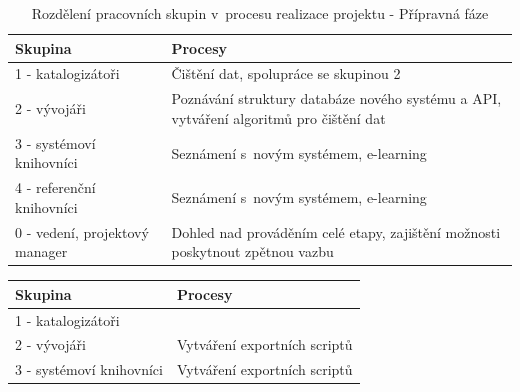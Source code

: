 \documentclass[
	11pt, oneside, printed, final, palatino, monochrome
	microtype,
	table,   %
	lof,     %
	lot     %
]{fithesis3}
\newcommand{\bold}[1]{\textbf{#1}}
\begin{document}
{\begin{table}[H]
    \centering
    \begin{tabular}{| p{3cm} | p{8.3cm} |}
    \hline
    \bold{Skupina} 	
    & 
    \bold{Procesy} 
    \\ \hline
    
    1 - katalogizátoři 
    & 
    Čištění dat, spolupráce se skupinou 2 
    \\ \hline
    
    2 - vývojáři 
    & 
	Poznávání struktury databáze nového systému a API, vytváření algoritmů pro čištění dat	
    \\ \hline
    
    3 - systémoví knihovníci
    & 
    Seznámení s~novým systémem, e-learning
    \\ \hline
    
    4 - referenční knihovníci
    & 
    Seznámení s~novým systémem, e-learning
    \\ \hline

	0 - vedení, projektový manager
    & 
    Dohled nad prováděním celé etapy, zajištění možnosti poskytnout zpětnou vazbu
    \\ \hline
    
    \end{tabular}
    \caption{Rozdělení pracovních skupin v~procesu realizace projektu - Přípravná fáze}
\end{table}
    
\begin{table}[H]
    \centering
    \begin{tabular}{| p{3cm} | p{8.3cm} |}
    \hline
    \bold{Skupina} 	
    & 
    \bold{Procesy} 
    \\ \hline
    
	1 - katalogizátoři
    & 
    
    \\ \hline
    
	2 - vývojáři
    & 
    Vytváření exportních scriptů
    \\ \hline
    
	3 - systémoví knihovníci
    & 
    Vytváření exportních scriptů
    \\ \hline
    

\end{tabular}
\end{table}}
\end{document}
